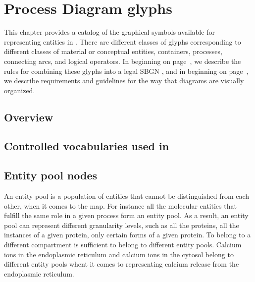 
\chapter{Process Diagram glyphs}


This chapter provides a catalog of the graphical symbols available for representing entities in \PDs.  There are different classes of glyphs corresponding to different classes of material or conceptual entities, containers, processes, connecting arcs, and logical operators.  In  beginning on page~\pageref{chp:grammar}, we describe the rules for combining these glyphs into a legal SBGN \PD, and in  beginning on page~\pageref{chp:layout}, we describe requirements and guidelines for the way that diagrams are visually organized.

\section{Overview}



\section{Controlled vocabularies used in \SBGNPDLone}\label{sec:CVs}




\section{Entity pool nodes}\label{sec:EPNs}

An entity pool is a population of entities that cannot be distinguished from each other, when it comes to the \SBGNPDLone map. For instance all the molecular  entities that fulfill the same role in a given process form an entity pool. As a result, an entity pool can represent different granularity levels, such as all the proteins, all the instances of a given protein, only certain forms of a given protein. To belong to a different compartment is sufficient to belong to different entity pools. Calcium ions in the endoplasmic reticulum and calcium ions in the cytosol belong to different entity pools whent it comes to representing calcium release from the endoplasmic reticulum.

